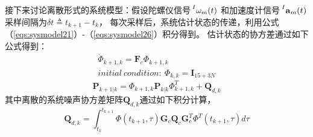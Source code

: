 \documentclass{article}
\begin{document}
\par
接下来讨论离散形式的系统模型：假设陀螺仪信号$\sideset{^I}{}{\mathop{\mathbf{\omega}_{m}(t)}}$
和加速度计信号$\sideset{^I}{}{\mathop{\mathbf{a}_{m}(t)}}$采样间隔为$\delta{t}\triangleq t_{k+1}-t_{k}$，
每次采样后，系统估计状态的传递，利用公式（\ref{eqs:sysmodel21}）-（\ref{eqs:sysmodel26}）积分得到。
估计状态的协方差通过如下公式得到：
\begin{equation}
    \begin{array}{c}
    \dot{\Phi}_{k+1,k} = \mathbf{F}_{c}\Phi_{k+1,k}\\
    initial\ condition:\ \Phi_{k,k}=\mathbf{I}_{15+3N}
    \end{array}
\end{equation}
\begin{equation}
    \textbf{P}_{k+1|k}=\Phi_{k+1,k}\mathbf{P}_{k|k}\Phi_{k+1,k}^{T}+\textbf{Q}_{d,k}
\end{equation}
其中离散的系统噪声协方差矩阵$\textbf{Q}_{d,k}$通过如下积分计算，
\begin{equation}
    \textbf{Q}_{d,k}=\int_{t_k}^{t_{k+1}}\Phi(t_{k+1},\tau)\textbf{G}_{c}\textbf{Q}_{c}\textbf{G}_{c}^{T}
    \Phi^{T}(t_{k+1},\tau)d\tau
\end{equation}
\end{document}
